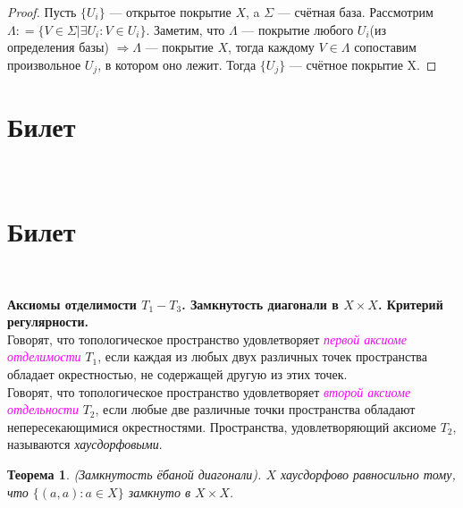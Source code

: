 \documentclass[a4paper,100pt]{article}
\theoremstyle{indented}
\newtheorem{theorem}{Теорема}
\begin{document}
    \begin{proof}
        
        Пусть $\{U_i\}$ --- открытое покрытие $X$, a $\Sigma$ --- счётная база. Рассмотрим $\Lambda: = \{V \in \Sigma | \exists U_i: V \in U_i\}$. Заметим, что $\Lambda$ --- покрытие любого $U_i$(из определения базы) $\Rightarrow \Lambda$ --- покрытие $X$, тогда каждому $V \in \Lambda$ сопоставим произвольное $U_j$, в котором оно лежит. Тогда $\{U_j\}$ --- счётное покрытие X. 
    \end{proof}

\section{Билет} \

\medskip

\section{Билет} \

\medskip

\textbf{Аксиомы отделимости $T_1 - T_3$. Замкнутость диагонали в $X\times X$. Критерий регулярности.}\\

Говорят, что топологическое пространство удовлетворяет \textcolor{magenta}{\textit{первой аксиоме отделимости}} $T_1$, если каждая из любых двух различных точек пространства обладает окрестностью, не содержащей другую из этих точек.\\

Говорят, что топологическое пространство удовлетворяет \textcolor{magenta}{\textit{второй аксиоме отдельности}} $T_2$, если любые две различные точки пространства обладают непересекающимися окрестностями. Пространства, удовлетворяющий аксиоме $T_2$, называются \textit{хаусдорфовыми}.\\

\begin{theorem}
    (Замкнутость ёбаной диагонали). $X$ хаусдорфово равносильно тому, что $\{(a,a):a\in X\}$ замкнуто в $X\times X$.
\end{theorem}
\end{document}
